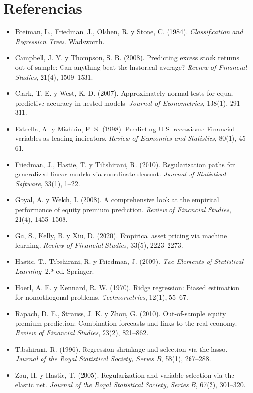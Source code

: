 \section*{Referencias}
\begin{itemize}[leftmargin=*]
  \item Breiman, L., Friedman, J., Olshen, R. y Stone, C. (1984). \emph{Classification and Regression Trees}. Wadsworth.
  \item Campbell, J. Y. y Thompson, S. B. (2008). Predicting excess stock returns out of sample: Can anything beat the historical average?
        \emph{Review of Financial Studies}, 21(4), 1509--1531.
  \item Clark, T. E. y West, K. D. (2007). Approximately normal tests for equal predictive accuracy in nested models. \emph{Journal of
        Econometrics}, 138(1), 291--311.
  \item Estrella, A. y Mishkin, F. S. (1998). Predicting U.S. recessions: Financial variables as leading indicators. \emph{Review of
        Economics and Statistics}, 80(1), 45--61.
  \item Friedman, J., Hastie, T. y Tibshirani, R. (2010). Regularization paths for generalized linear models via coordinate descent.
        \emph{Journal of Statistical Software}, 33(1), 1--22.
  \item Goyal, A. y Welch, I. (2008). A comprehensive look at the empirical performance of equity premium prediction. \emph{Review of
        Financial Studies}, 21(4), 1455--1508.
  \item Gu, S., Kelly, B. y Xiu, D. (2020). Empirical asset pricing via machine learning. \emph{Review of Financial Studies}, 33(5),
        2223--2273.
  \item Hastie, T., Tibshirani, R. y Friedman, J. (2009). \emph{The Elements of Statistical Learning}, 2.ª ed. Springer.
  \item Hoerl, A. E. y Kennard, R. W. (1970). Ridge regression: Biased estimation for nonorthogonal problems. \emph{Technometrics}, 12(1),
        55--67.
  \item Rapach, D. E., Strauss, J. K. y Zhou, G. (2010). Out-of-sample equity premium prediction: Combination forecasts and links to the real
        economy. \emph{Review of Financial Studies}, 23(2), 821--862.
  \item Tibshirani, R. (1996). Regression shrinkage and selection via the lasso. \emph{Journal of the Royal Statistical Society, Series B},
        58(1), 267--288.
  \item Zou, H. y Hastie, T. (2005). Regularization and variable selection via the elastic net. \emph{Journal of the Royal Statistical
        Society, Series B}, 67(2), 301--320.
\end{itemize}

